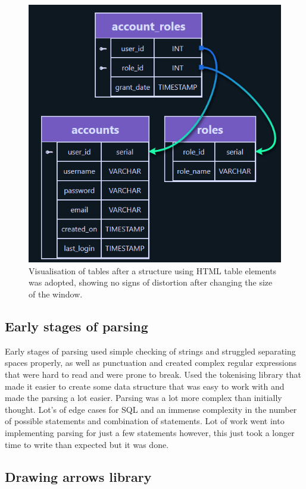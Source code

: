 \begin{figure}[h!]
	\centering
	\includegraphics[scale=0.7]{newPostSquash}
	\caption{Visualisation of tables after a structure using HTML table elements was adopted, showing no signs of distortion after changing the size of the window.}
	\label{fig:afterSquash}
\end{figure}

\subsection{Early stages of parsing}

Early stages of parsing used simple checking of strings and struggled separating spaces properly, as well as punctuation and created complex regular expressions that were hard to read and were prone to break. Used the tokenising library that made it easier to create some data structure that was easy to work with and made the parsing a lot easier. Parsing was a lot more complex than initially thought. Lot's of edge cases for SQL and an immense complexity in the number of possible statements and combination of statements. Lot of work went into implementing parsing for just a few statements however, this just took a longer time to write than expected but it was done.

\subsection{Drawing arrows library}

